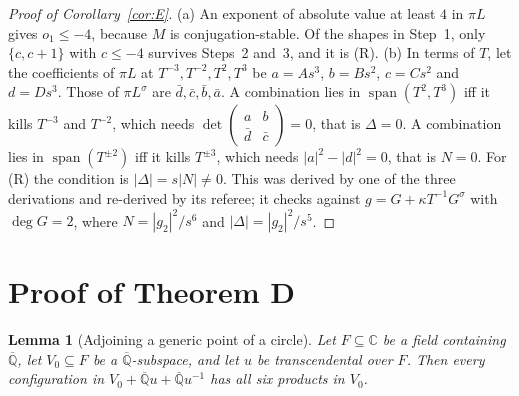 \documentclass[11pt,a4paper]{article}
\theoremstyle{plain}
\newtheorem{lemma}[theorem]{Lemma}
\theoremstyle{definition}
\newcommand{\C}{\mathbb{C}}
\newcommand{\Qbar}{\overline{\mathbb{Q}}}
\newcommand{\spn}{\operatorname{span}}
\begin{document}
\begin{proof}[Proof of Corollary~\ref{cor:E}]
(a) An exponent of absolute value at least $4$ in $\pi L$ gives $o_{1}\le-4$, because
$M$ is conjugation-stable. Of the shapes in Step~1, only $\{c,c+1\}$ with $c\le-4$
survives Steps~2 and~3, and it is (R).
(b) In terms of $T$, let the coefficients of $\pi L$ at $T^{-3},T^{-2},T^{2},T^{3}$ be
$a=As^{3}$, $b=Bs^{2}$, $c=Cs^{2}$ and $d=Ds^{3}$. Those of $\pi L^{\sigma}$ are
$\bar d,\bar c,\bar b,\bar a$. A combination lies in $\spn(T^{2},T^{3})$ iff it kills
$T^{-3}$ and $T^{-2}$, which needs $\det\begin{pmatrix}a&b\\ \bar d&\bar c\end{pmatrix}=0$,
that is $\Delta=0$. A combination lies in $\spn(T^{\pm2})$ iff it kills $T^{\pm3}$, which
needs $|a|^{2}-|d|^{2}=0$, that is $N=0$. For (R) the condition is $|\Delta|=s|N|\neq0$.
This was derived by one of the three derivations and re-derived by its referee; it
checks against $g=G+\kappa T^{-1}G^{\sigma}$ with $\deg G=2$, where $N=|g_{2}|^{2}/s^{6}$ and
$|\Delta|=|g_{2}|^{2}/s^{5}$.
\end{proof}
\section{Proof of Theorem D}\label{sec:proofD}

\begin{lemma}[Adjoining a generic point of a circle]\label{lem:inversion}
Let $F\subseteq\C$ be a field containing $\Qbar$, let $V_{0}\subseteq F$ be a $\Qbar$-subspace,
and let $u$ be transcendental over $F$. Then every configuration in
$V_{0}+\Qbar u+\Qbar u^{-1}$ has all six products in $V_{0}$.
\end{lemma}
\end{document}
